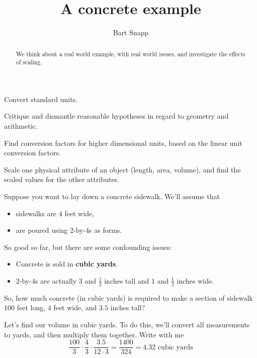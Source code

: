 \documentclass[handout,nooutcomes,noauthor]{ximera}
\title{A concrete example}
\author{Bart Snapp}
\begin{document}
\begin{abstract}
  We think about a real world example, with real world issues, and
  investigate the effects of scaling.
\end{abstract}
\maketitle


\begin{listOutcomes}
\item Convert standard units.
\item Critique and dismantle reasonable hypotheses in regard to
  geometry and arithmetic.
\item Find conversion factors for higher dimensional units, based on
  the linear unit conversion factors.
\item Scale one physical attribute of an object (length, area,
  volume), and find the scaled values for the other attributes.
\end{listOutcomes}



\mynewpage



\begin{question}
  Suppose you want to lay down a concrete sidewalk. We'll assume that
  \begin{itemize}
  \item sidewalks are $4$ feet wide,
  \item are poured using $2$-by-$4$s as forms.
  \end{itemize}
  So good so far, but there are some confounding issues:
  \begin{itemize}
  \item Concrete is sold in \textbf{cubic yards}.
  \item $2$-by-$4$s are actually $3$ and $\frac{1}{2}$ inches tall and
    $1$ and $\frac{1}{2}$ inches wide.
  \end{itemize}
  So, how much concrete (in cubic yards) is required to make a section
  of sidewalk $100$ feet long, $4$ feet wide, and $3.5$ inches tall?
  \begin{freeResponse}
    Let's find our volume in cubic yards. To do this, we'll convert
    all measurements to yards, and then multiply them together. Write with me
    \[
    \frac{100}{3} \cdot \frac{4}{3}\cdot \frac{3.5}{12\cdot 3} = \frac{1400}{324} = 4.32 \text{ cubic yards}
    \] 
  \end{freeResponse}
\end{question}
\mynewpage
\end{document}
